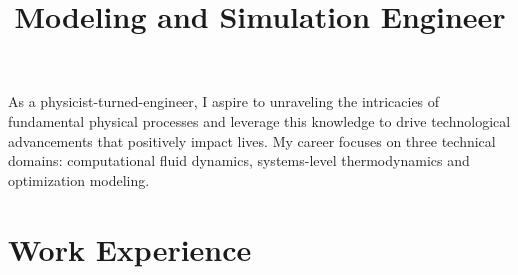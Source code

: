 \documentclass[5pt,a4paper,sans]{moderncv}
\title{ \hspace{-19pt}\LARGE{
		Modeling and Simulation Engineer
	}}                             %
\begin{document}
	\makecvtitle
	
	\vspace{-25pt}
	
	\footnotesize{
	As a physicist-turned-engineer, I aspire to unraveling the intricacies of 	fundamental physical processes and leverage this knowledge to drive technological advancements that positively impact lives. 
	My career focuses on three technical domains: computational fluid dynamics, systems-level thermodynamics and optimization modeling.
}

	
	\vspace{-10pt}
	
	\section{Work Experience}
	
	\vspace{1.5pt}
	
\end{document}
